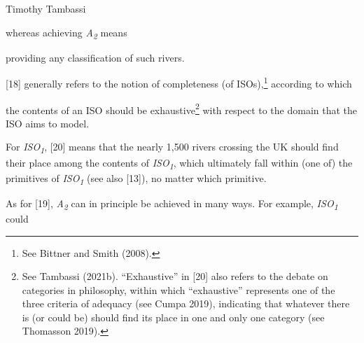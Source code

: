 \begin{artengenv}{Timothy Tambassi}
\begin{enumerate}[label={[\arabic*]}]
\end{enumerate}

whereas achieving \textit{A}\textit{\textsubscript{2}} means



\setcounter{saveenumtambassi}{\value{enumi}}

\begin{enumerate}[label={[\arabic*]}]

\setcounter{enumi}{\value{saveenumtambassi}}

\item providing any classification of such rivers.

\end{enumerate}

[18] generally refers to the notion of completeness (of ISOs),\footnote{See Bittner and Smith (2008).} according to which



\setcounter{saveenumtambassi}{\value{enumi}}

\begin{enumerate}[label={[\arabic*]}]

\setcounter{enumi}{\value{saveenumtambassi}}

\item the contents of an ISO should be exhaustive\footnote{See Tambassi (2021b). ``Exhaustive'' in [20] also refers to the debate on categories in philosophy, within which ``exhaustive'' represents one of the three criteria of adequacy (see Cumpa 2019), indicating that whatever there is (or could be) should find its place in one and only one category (see Thomasson 2019). } with respect to the domain that the ISO aims to model.

\end{enumerate}

For \textit{ISO}\textit{\textsubscript{1}}, [20] means that the nearly 1,500 rivers crossing the UK should find their place among the contents of \textit{ISO}\textit{\textsubscript{1}}, which ultimately fall within (one of) the primitives of \textit{ISO}\textit{\textsubscript{1}} (see also [13]), no matter which primitive.



As for [19], \textit{A}\textit{\textsubscript{2}} can in principle be achieved in many ways. For example, \textit{ISO}\textit{\textsubscript{1}} could



\setcounter{saveenumtambassi}{\value{enumi}}

\begin{enumerate}[label={[\arabic*]}]


\end{enumerate}
\end{artengenv}
